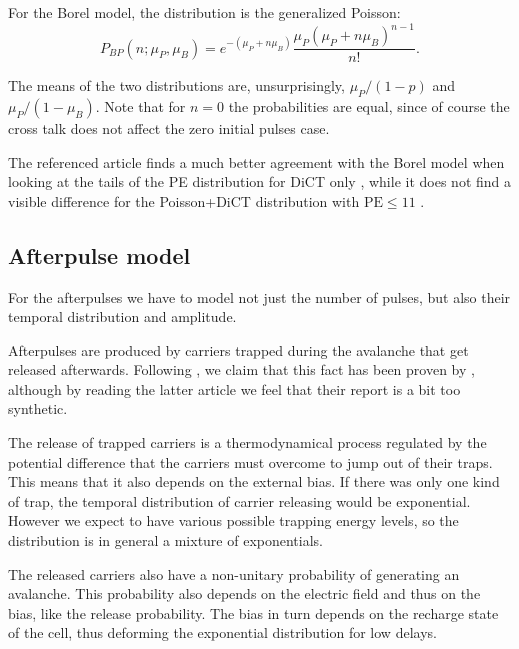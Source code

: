 For the Borel model, the distribution is the generalized Poisson:
%
\begin{equation}
    P_{BP}(n;\mu_P,\mu_B)
    = e^{-(\mu_P + n\mu_B)} \frac {\mu_P(\mu_P + n\mu_B)^{n-1}} {n!}.
    \label{eq:genpoisson}
\end{equation}

The means of the two distributions are, unsurprisingly, $\mu_P/(1-p)$ and
$\mu_P/(1-\mu_B)$. Note that for $n = 0$ the probabilities are equal, since
of course the cross talk does not affect the zero initial pulses case.

The referenced article finds a much better agreement with the Borel model when
looking at the tails of the PE distribution for DiCT only
\cite[p.~3~fig.~1]{vinogradov2012}, while it does not find a visible difference
for the Poisson+DiCT distribution with $\text{PE} \le 11$
\cite[p.~4~fig.~2]{vinogradov2012}.

\subsection{Afterpulse model}
\label{sec:aptheory}

For the afterpulses we have to model not just the number of pulses, but also
their temporal distribution and amplitude.

Afterpulses are produced by carriers trapped during the avalanche that get
released afterwards. Following \cite[1]{nagy2014}, we claim that this fact has
been proven by \cite{cova1991}, although by reading the latter article we feel
that their report is a bit too synthetic.

The release of trapped carriers is a thermodynamical process regulated by the
potential difference that the carriers must overcome to jump out of their
traps. This means that it also depends on the external bias. If there was only
one kind of trap, the temporal distribution of carrier releasing would be
exponential. However we expect to have various possible trapping energy levels,
so the distribution is in general a mixture of exponentials.

The released carriers also have a non-unitary probability of generating an
avalanche. This probability also depends on the electric field and thus on the
bias, like the release probability. The bias in turn depends on the recharge
state of the cell, thus deforming the exponential distribution for low delays.

